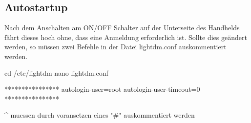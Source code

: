 \subsection{Autostartup}

Nach dem Anschalten am ON/OFF Schalter auf der Unterseite des Handhelds fährt dieses hoch ohne, dass eine Anmeldung erforderlich ist. Sollte dies geändert werden, so müssen zwei Befehle in der Datei lightdm.conf auskommentiert werden. 
\begin{code}
cd /etc/lightdm
nano lightdm.conf

****************
autologin-user=root
autologin-user-timeout=0
****************

^ muessen durch voransetzen eines "#" auskommentiert werden
\end{code}